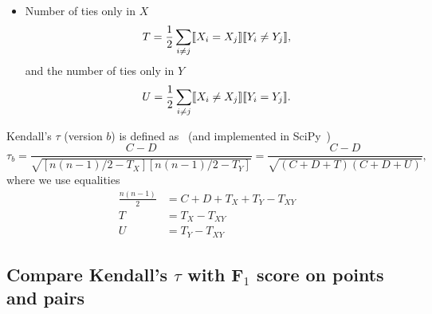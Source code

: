 \begin{itemize}
\item Number of ties only in $X$
      \begin{equation*}
      T = \frac{1}{2} \sum_{i \ne j} \llbracket X_i = X_j \rrbracket  \llbracket Y_i \ne Y_j \rrbracket,
      \end{equation*}
      and the number of ties only in $Y$
      \begin{equation*}
      U = \frac{1}{2} \sum_{i \ne j} \llbracket X_i \ne X_j \rrbracket  \llbracket Y_i = Y_j \rrbracket.
      \end{equation*}
\end{itemize}

Kendall's $\tau$ (version $b$) is defined as~\cite{kendall1945,agresti2010analysis} (and implemented in SciPy~\cite{scipy})
\begin{equation*}
\tau_b = \frac{C - D}{\sqrt{[n(n-1)/2 - T_X] [n(n-1)/2 - T_Y]}} = \frac{C - D}{\sqrt{(C + D + T) (C + D + U)}},
\end{equation*}
where we use equalities 
\begin{align*}
\frac{n(n-1)}{2} &= C + D + T_X + T_Y - T_{XY} \\
T &= T_X - T_{XY} \\
U &= T_Y - T_{XY}
\end{align*}



\subsection{Compare Kendall's $\tau$ with F$_1$ score on points and pairs}
\label{sec:metriccomparison}

